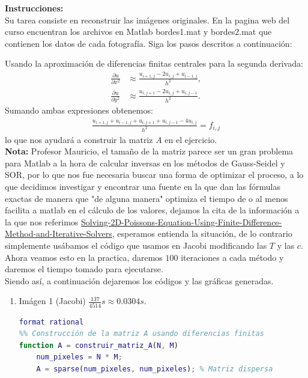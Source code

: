 \begin{homeworkProblem}
\begin{center}
  \end{center} 
  \textbf{Instrucciones:}\\
  Su tarea consiste en reconstruir las imágenes originales. En la pagina web del curso encuentran los archivos en Matlab bordes1.mat y bordes2.mat que contienen los datos de cada fotografía. Siga los pasos descritos a continuación:
  \begin{solucion}
    Usando la aproximación de diferencias finitas centrales para la segunda derivada:
    \begin{align*}
      \frac{\partial u}{\partial x^2}&\approx \frac{u_{i+1,j}-2u_{i,j}+u_{i-1,j}}{h^2},\\
      \frac{\partial u}{\partial y^2}&\approx \frac{u_{i,j+1}-2u_{i,j}+u_{i,j-1}}{h^2}.
    \end{align*}
    Sumando ambas expresiones obtenemos:
    \begin{align*}
      \frac{u_{i+1,j}+u_{i-1,j}+u_{i,j+1}+u_{i,j-1}-4u_{i,j}}{h^2}=f_{i,j}
    \end{align*}
    lo que nos ayudará a construir la matriz $A$ en el ejercicio.\\
    \textbf{Nota:} Profesor Mauricio, el tamaño de la matriz parece ser un gran problema para Matlab a la hora de calcular inversas en los métodos de Gauss-Seidel y SOR, por lo que nos fue necesaria buscar una forma de optimizar el proceso, a lo que decidimos investigar y encontrar una fuente en la que dan las fórmulas exactas de manera que "de alguna manera" optimiza el tiempo de o al menos facilita a matlab en el cálculo de los valores, dejamos la cita de la información a la que nos referimos \href{https://github.com/reece-iriye/Solving-2D-Poissons-Equation-Using-Finite-Difference-Method-and-Iterative-Solvers/tree/main}{Solving-2D-Poissons-Equation-Using-Finite-Difference-Method-and-Iterative-Solvers}, esperamos entienda la situación, de lo contrario simplemente usábamos el código que usamos en Jacobi modificando las $T$ y las $c$.
    Ahora veamos esto en la practica, daremos $100$ iteraciones a cada método y daremos el tiempo tomado para ejecutarse.\\
    Siendo así, a continuación dejaremos los códigos y las gráficas generadas.
    \newpage
    \begin{enumerate}
      \item Imágen 1 (Jacobi) $\frac{137}{4514}s\approx 0.0304 s$.
        \begin{lstlisting}[language = matlab]
format rational
%% Construcción de la matriz A usando diferencias finitas
function A = construir_matriz_A(N, M)
    num_pixeles = N * M;
    A = sparse(num_pixeles, num_pixeles); % Matriz dispersa


\end{lstlisting}
\end{enumerate}
\end{solucion}
\end{homeworkProblem}
